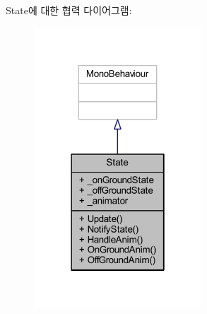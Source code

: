 State에 대한 협력 다이어그램\+:\nopagebreak
\begin{figure}[H]
\begin{center}
\leavevmode
\includegraphics[width=178pt]{dc/d8f/class_state__coll__graph}
\end{center}
\end{figure}

